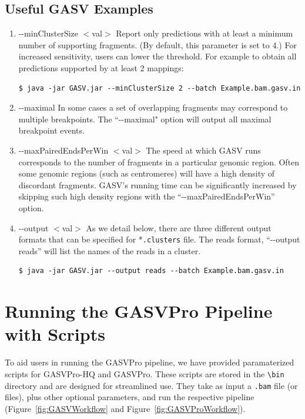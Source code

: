 \documentclass[11pt]{article}
\begin{document}
\subsection{Useful GASV Examples} 
\begin{enumerate}

\item -{}-minClusterSize $<$val$>$
Report only predictions with at least a minimum number of supporting 
fragments. (By default, this parameter is set to 4.) For increased sensitivity, users can lower the threshold. For example to obtain all predictions supported by at least 2 mappings:

\begin{framed}
{ \small
\begin{Verbatim}
$ java -jar GASV.jar --minClusterSize 2 --batch Example.bam.gasv.in
\end{Verbatim}
}
\end{framed}

\item -{}-maximal
In some cases a set of overlapping fragments may correspond to 
multiple breakpoints. The ``-{}-maximal" option will output 
all maximal breakpoint events.

\item -{}-maxPairedEndsPerWin $<$val$>$
The speed at which GASV runs corresponds to the number of fragments in 
a particular genomic region. Often some genomic regions (such as centromeres) 
will have a high density of discordant fragments. GASV's running time
can be significantly increased by skipping such high density regions with 
the ``-{}-maxPairedEndsPerWin'' option.

\item -{}-output $<$val$>$
As we detail below, there are three different output formats
that can be specified for *\verb+.clusters+ file. The reads format, ``-{}-output reads'' 
will list the names of the reads in a cluster. 

\begin{framed}
{\small
\begin{Verbatim}
$ java -jar GASV.jar --output reads --batch Example.bam.gasv.in
\end{Verbatim}
}
\end{framed}

\end{enumerate}

\clearpage

\section{Running the GASVPro Pipeline with Scripts}
\label{sec:GASVProScripts}
To aid users in running the GASVPro pipeline, we have provided paramaterized scripts for GASVPro-HQ and GASVPro. These scripts are stored in the \verb+\bin+ directory and are designed for streamlined use. They take as input a \verb+.bam+ file (or files), plus other optional parameters, and run the respective pipeline (Figure~\ref{fig:GASVWorkflow} and Figure~\ref{fig:GASVProWorkflow}). 
\end{document}
